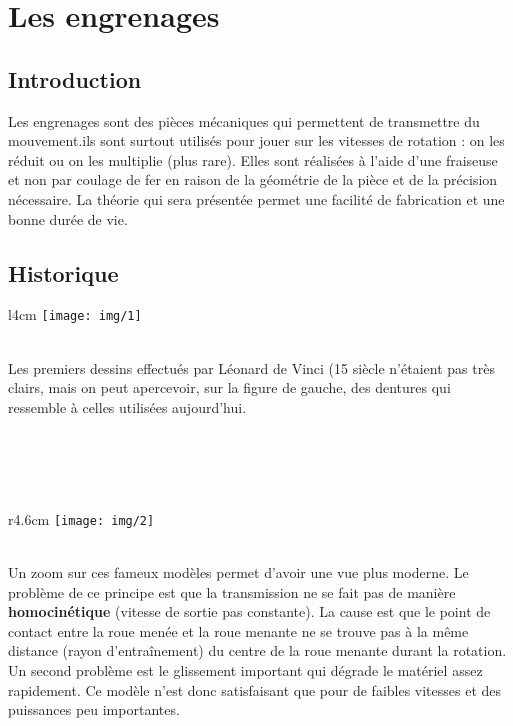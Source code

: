 
\chapter{Les engrenages}

\section{Introduction}
	Les engrenages sont des pièces mécaniques qui permettent de transmettre du mouvement.ils sont surtout utilisés pour jouer sur les vitesses de rotation : on les réduit ou on les multiplie (plus rare). Elles sont réalisées à l'aide d'une fraiseuse et non par coulage de fer en raison de la géométrie de la pièce et de la précision nécessaire. La théorie qui sera présentée permet une facilité de fabrication et une bonne durée de vie.

\section{Historique}
	\begin{wrapfigure}[4]{l}{4cm}
	\texttt{[image: img/1]}
	\end{wrapfigure}
	\ \\ Les premiers dessins effectués par Léonard de Vinci (15 siècle n'étaient pas très clairs, mais on peut apercevoir, sur la figure de gauche, des dentures qui ressemble à celles utilisées aujourd'hui. \\\\\\\\\
	
	\begin{wrapfigure}[10]{r}{4.6cm}
	\texttt{[image: img/2]}
	\end{wrapfigure}	
	\ \\ Un zoom sur ces fameux modèles permet d'avoir une vue plus moderne. Le problème de ce principe est que la transmission ne se fait pas de manière \textbf{homocinétique} (vitesse de sortie pas constante). La cause est que le point de contact entre la roue menée et la roue menante ne se trouve pas à la même distance (rayon d'entraînement) du centre de la roue menante durant la rotation.  \\
	Un second problème est le glissement important qui dégrade le matériel assez rapidement. Ce modèle n'est donc satisfaisant que pour de faibles vitesses et des puissances peu importantes. 
	

